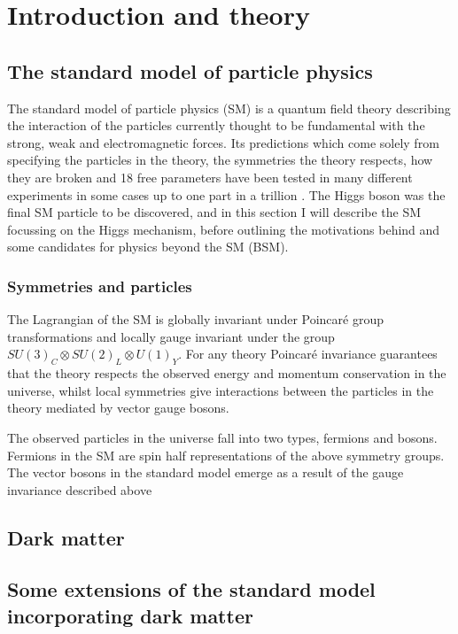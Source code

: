 \chapter{Introduction and theory}
\label{chap:theory}

\section{The standard model of particle physics}
\label{sec:SM}

The standard model of particle physics (SM) is a quantum field theory describing the interaction of the particles currently thought to be fundamental with the strong, weak and electromagnetic forces. Its predictions which come solely from specifying the particles in the theory, the symmetries the theory respects, how they are broken and 18 free parameters have been tested in many different experiments in some cases up to one part in a trillion \cite{PhysRevLett.100.120801}. The Higgs boson was the final SM particle to be discovered, and in this section I will describe the SM focussing on the Higgs mechanism, before outlining the motivations behind and some candidates for physics beyond the SM (BSM).

\subsection{Symmetries and particles}
The Lagrangian of the SM is globally invariant under Poincar\'e group transformations and locally gauge invariant under the group $SU\left(3\right)_{C}\otimes SU\left(2\right)_{L}\otimes U\left(1\right)_{Y}$. For any theory Poincar\'e invariance guarantees that the theory respects the observed energy and momentum conservation in the universe, whilst local symmetries give interactions between the particles in the theory mediated by vector gauge bosons. %

The observed particles in the universe fall into two types, fermions and bosons. Fermions in the SM are spin half representations of the above symmetry groups. The vector bosons in the standard model emerge as a result of the gauge invariance described above %




\section{Dark matter}
\label{sec:DM}

\section{Some extensions of the standard model incorporating dark matter}
\label{sec:DMextensions}
